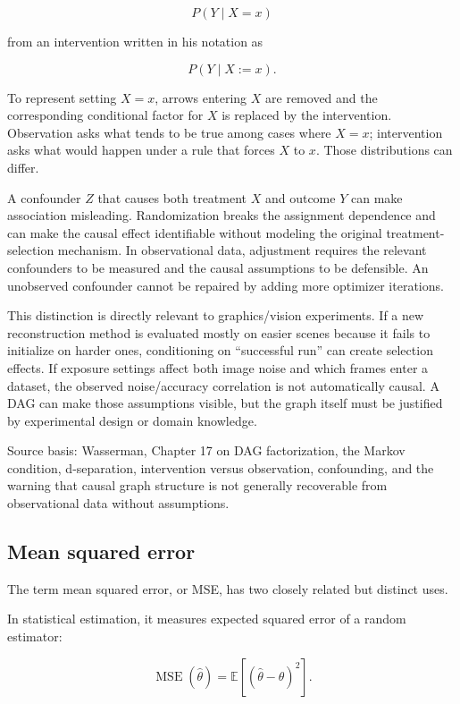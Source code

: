 \[
P(Y\mid X=x)
\]

from an intervention written in his notation as

\[
P(Y\mid X:=x).
\]

To represent setting \(X=x\), arrows entering \(X\) are removed and the corresponding conditional factor for \(X\) is replaced by the intervention. Observation asks what tends to be true among cases where \(X=x\); intervention asks what would happen under a rule that forces \(X\) to \(x\). Those distributions can differ.

A confounder \(Z\) that causes both treatment \(X\) and outcome \(Y\) can make association misleading. Randomization breaks the assignment dependence and can make the causal effect identifiable without modeling the original treatment-selection mechanism. In observational data, adjustment requires the relevant confounders to be measured and the causal assumptions to be defensible. An unobserved confounder cannot be repaired by adding more optimizer iterations.

This distinction is directly relevant to graphics/vision experiments. If a new reconstruction method is evaluated mostly on easier scenes because it fails to initialize on harder ones, conditioning on ``successful run'' can create selection effects. If exposure settings affect both image noise and which frames enter a dataset, the observed noise/accuracy correlation is not automatically causal. A DAG can make those assumptions visible, but the graph itself must be justified by experimental design or domain knowledge.

Source basis: Wasserman, Chapter 17 on DAG factorization, the Markov condition, d-separation, intervention versus observation, confounding, and the warning that causal graph structure is not generally recoverable from observational data without assumptions.

\subsection{Mean squared error}\label{02-foundations-ii-ch030-mean-squared-error}

The term mean squared error, or MSE, has two closely related but distinct uses.

In statistical estimation, it measures expected squared error of a random estimator:

\[
 \boxed{ \operatorname{MSE}(\widehat\theta) = \mathbb E[(\widehat\theta-\theta)^2] }.
\]

